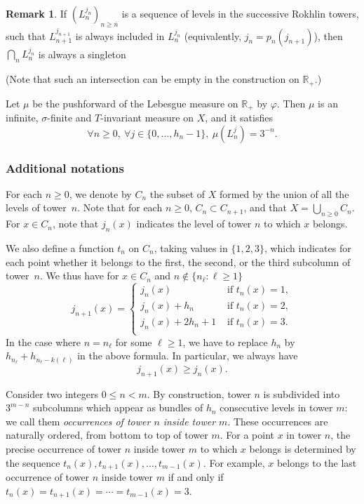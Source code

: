 \documentclass[10pt]{amsart}
\theoremstyle{definition}\newtheorem{defi}[theo]{Definition}\newtheorem{rema}[theo]{Remark}\newtheorem{exam}[theo]{Example}\newtheorem{exem}[theo]{Example}\newtheorem{nota}[theo]{Notation}
\newcommand{\RR}{\mathbb{R}}
\let\oldforall\forall
\renewcommand*{\forall}{\mathrel{\oldforall}}
\begin{document}
\begin{rema}\label{rem:nonemptyintersection}
If $\left(L_n^{j_n}\right)_{n\ge \overline{n}}$ is a sequence of levels in the successive Rokhlin towers, such that $L_{n+1}^{j_{n+1}}$ is always included in $L_n^{j_n}$ (equivalently, $j_n=p_n(j_{n+1})$), then $\bigcap_n L_n^{j_n}$ is always a singleton
\end{rema}

(Note that such an intersection can be empty in the construction on $\RR_+$.)

Let $\mu$ be the pushforward of the Lebesgue measure on $\RR_+$ by $\varphi$. Then $\mu$ is an infinite, $\sigma$-finite and $T$-invariant measure on $X$, and it satisfies
\[
\forall n\ge0,\ \forall j\in\{0,\ldots,h_n-1\},\ \mu(L_n^j)=3^{-n}.
\]

\subsubsection*{Additional notations}

For each $n\ge0$, we denote by $C_n$ the subset of $X$ formed by the union of all the levels of tower~$n$. Note that for each $n\ge0$, $C_n\subset C_{n+1}$, and that $X=\bigcup_{n\ge0}C_n$. For $x\in C_n$, note that $j_n(x)$ indicates the level of tower $n$ to which $x$ belongs.

We also define a function $t_n$ on $C_n$, taking values in $\{1,2,3\}$, which indicates for each point whether it belongs to the first, the second, or the third subcolumn of tower~$n$. We thus have for $x\in C_n$ and $n\notin\{n_\ell:\ell\ge1\}$
\begin{equation}\label{eq:induction_for_j_n}
j_{n+1}(x) =
\begin{cases}
j_n(x) & \text{ if }t_n(x)=1,\\
j_n(x)+h_n & \text{ if }t_n(x)=2,\\
j_n(x)+2h_n+1 & \text{ if }t_n(x)=3.\\
\end{cases}
\end{equation}
In the case where $n=n_\ell$ for some $\ell\ge1$, we have to replace $h_n$ by $h_{n_\ell}+h_{n_\ell-k(\ell)}$ in the above formula. In particular, we always have
\begin{equation}\label{eq:s_n}
j_{n+1}(x) \ge j_n(x).
\end{equation}

Consider two integers $0\le n < m$. By construction, tower $n$ is subdivided into $3^{m-n}$ subcolumns which appear as bundles of $h_n$ consecutive levels in tower $m$: we call them \emph{occurrences of tower $n$ inside tower $m$}. These occurrences are naturally ordered, from bottom to top of tower $m$. For a point $x$ in tower $n$, the precise occurrence of tower $n$ inside tower $m$ to which $x$ belongs is determined by the sequence $t_n(x),t_{n+1}(x),\ldots,t_{m-1}(x)$. For example, $x$ belongs to the last occurrence of tower $n$ inside tower $m$ if and only if $t_n(x)=t_{n+1}(x)=\cdots=t_{m-1}(x)=3$.
\end{document}
